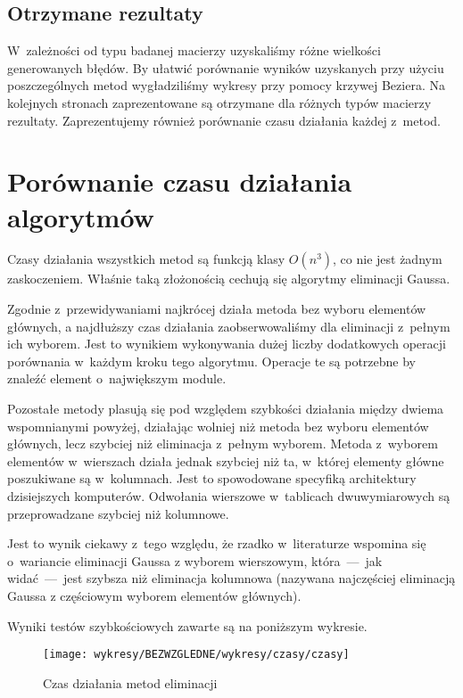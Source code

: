\documentclass[a4paper]{article}
\begin{document}
\subsection{Otrzymane rezultaty}
W~zależności od typu badanej macierzy uzyskaliśmy różne wielkości generowanych błędów. By ułatwić porównanie
wyników uzyskanych przy użyciu poszczególnych metod wygładziliśmy wykresy przy pomocy krzywej Beziera. Na kolejnych stronach zaprezentowane są 
otrzymane dla różnych typów macierzy rezultaty. Zaprezentujemy również porównanie czasu działania każdej z~metod.

\section{Porównanie czasu działania algorytmów}
Czasy działania wszystkich metod są funkcją klasy $O(n^3)$, co nie jest żadnym zaskoczeniem. Właśnie taką złożonością cechują się algorytmy eliminacji Gaussa. 

Zgodnie z~przewidywaniami najkrócej działa metoda bez wyboru elementów głównych, a najdłuższy czas działania zaobserwowaliśmy dla eliminacji z~pełnym ich wyborem. Jest to
wynikiem wykonywania dużej liczby dodatkowych operacji porównania w~każdym kroku tego algorytmu. Operacje te są potrzebne by znaleźć element o~największym module.

Pozostałe metody plasują się pod względem szybkości działania między dwiema wspomnianymi powyżej, działając wolniej niż metoda bez wyboru elementów głównych, lecz szybciej niż eliminacja
z~pełnym wyborem. Metoda z~wyborem elementów w~wierszach działa jednak szybciej niż ta, w~której elementy główne poszukiwane są w~kolumnach. Jest to spowodowane specyfiką architektury
dzisiejszych komputerów. Odwołania wierszowe w~tablicach dwuwymiarowych są przeprowadzane szybciej niż kolumnowe.

Jest to wynik ciekawy z~tego względu, że rzadko w~literaturze wspomina 
się o~wariancie eliminacji Gaussa z wyborem wierszowym, która~---~jak widać~---~jest szybsza niż eliminacja kolumnowa (nazywana najczęściej eliminacją Gaussa z częściowym wyborem elementów głównych).

Wyniki testów szybkościowych zawarte są na poniższym wykresie.

\begin{figure}[H]
\centering
 \texttt{[image: wykresy/BEZWZGLEDNE/wykresy/czasy/czasy]}
\caption{Czas działania metod eliminacji}
\label{fig:czas}
\end{figure}
\end{document}
